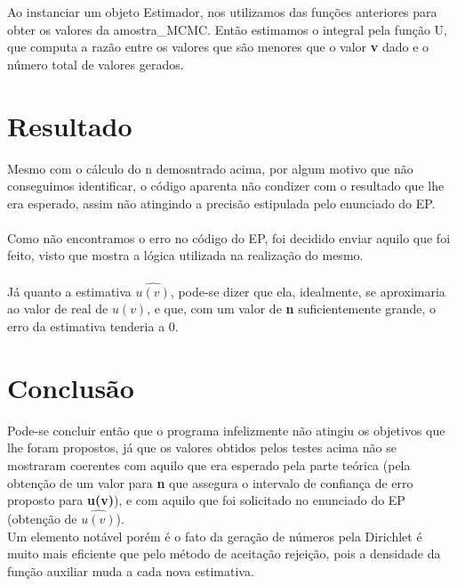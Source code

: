 \documentclass{article}
\begin{document}
    Ao instanciar um objeto Estimador, nos utilizamos das funções anteriores para obter os valores da amostra\_MCMC. Então estimamos o integral pela função U, que computa a razão entre os valores que são menores que o valor \textbf{v} dado e o número total de valores gerados.

\section{Resultado}
    
    Mesmo com o cálculo do n demosntrado acima, por algum motivo que não conseguimos identificar, o código aparenta não condizer com o resultado que lhe era esperado, assim não atingindo a precisão estipulada pelo enunciado do EP.\\
    \\
    Como não encontramos o erro no código do EP, foi decidido enviar aquilo que foi feito, visto que mostra a lógica utilizada na realização do mesmo.\\
    \\
    Já quanto a estimativa $\hat{u(v)}$, pode-se dizer que ela, idealmente, se aproximaria ao valor de real de $u(v)$, e que, com um valor de \textbf{n} suficientemente grande, o erro da estimativa tenderia a 0.

\section{Conclusão}

    Pode-se concluir então que o programa infelizmente não atingiu os objetivos que lhe foram propostos, já que os valores obtidos pelos testes acima não se mostraram coerentes com aquilo que era esperado pela parte teórica (pela obtenção de um valor para \textbf{n} que assegura o intervalo de confiança de erro proposto para \textbf{u(v)}), e com aquilo que foi solicitado no enunciado do EP (obtenção de $\hat{u(v)}$).\\
    
    Um elemento notável porém é o fato da geração de números pela Dirichlet é muito mais eficiente que pelo método de aceitação rejeição, pois a densidade da função auxiliar muda a cada nova estimativa.
\end{document}

